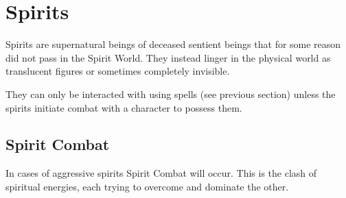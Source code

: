 \section{Spirits}
Spirits are supernatural beings of deceased sentient beings that for some reason did not pass in the Spirit World. They instead linger in the physical world as translucent figures or sometimes completely invisible.

They can only be interacted with using spells (see previous section) unless the spirits initiate combat with a character to possess them.

\subsection{Spirit Combat}
\label{ssec:spirit-combat}

In cases of aggressive spirits Spirit Combat will occur. This is the clash of spiritual energies, each trying to overcome and dominate the other.

